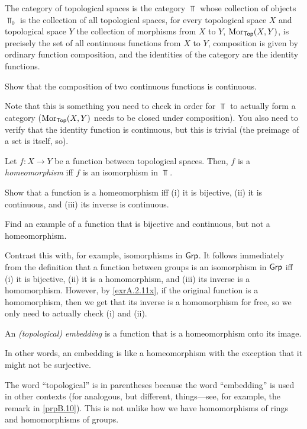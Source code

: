 \begin{exm}
The category of topological spaces is the category $\Top$\index[notation]{$\Top$} whose collection of objects $\Top _0$ is the collection of all topological spaces, for every topological space $X$ and topological space $Y$ the collection of morphisms from $X$ to $Y$, $\operatorname{Mor} _{\mathsf{Top}}(X,Y)$, is precisely the set of all continuous functions from $X$ to $Y$, composition is given by ordinary function composition, and the identities of the category are the identity functions.
\begin{exr}
Show that the composition of two continuous functions is continuous.
\begin{rmk}
Note that this is something you need to check in order for $\Top$ to actually form a category ($\operatorname{Mor} _{\mathsf{Top}}(X,Y)$ needs to be closed under composition).  You also need to verify that the identity function is continuous, but this is trivial (the preimage of a set is itself, so\textellipsis ).
\end{rmk}
\end{exr}
\end{exm}
\begin{dfn}[Homeomorphism]\label{Homeomorphism}
Let $f:X\rightarrow Y$ be a function between topological spaces.  Then, $f$ is a \emph{homeomorphism} iff $f$ is an isomorphism in $\Top$.
\end{dfn}
\begin{exr}
Show that a function is a homeomorphism iff (i) it is bijective, (ii) it is continuous, and (iii) its inverse is continuous.
\end{exr}
\begin{exr}\label{exr3.1.34}
Find an example of a function that is bijective and continuous, but not a homeomorphism.
\begin{rmk}
Contrast this with, for example, isomorphisms in $\mathsf{Grp}$.  It follows immediately from the definition that a function between groups is an isomorphism in $\mathsf{Grp}$ iff (i) it is bijective, (ii) it is a homomorphism, and (iii) its inverse is a homomorphism.  However, by \cref{exrA.2.11x}, if the original function is a homomorphism, then we get that its inverse is a homomorphism for free, so we only need to actually check (i) and (ii).
\end{rmk}
\end{exr}
\begin{dfn}[Embedding]\label{Embedding}
An \emph{(topological) embedding} is a function that is a homeomorphism onto its image.
\begin{rmk}
In other words, an embedding is like a homeomorphism with the exception that it might not be surjective.
\end{rmk}
\begin{rmk}
The word ``topological'' is in parentheses because the word ``embedding'' is used in other contexts (for analogous, but different, things---see, for example, the remark in \cref{prpB.10}).  This is not unlike how we have homomorphisms of rings and homomorphisms of groups.
\end{rmk}
\end{dfn}
